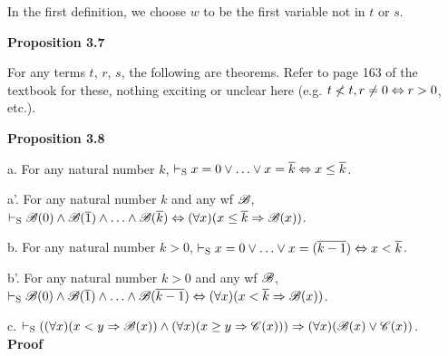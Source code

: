 In the first definition, we choose $w$ to be the first variable not in $t$ or $s$.

\textbf{Proposition 3.7}

For any terms $t$, $r$, $s$, the following are theorems. Refer to page 163 of the textbook for these, nothing exciting or unclear here (e.g. $t \not < t, r \not = 0 \Leftrightarrow r > 0$, etc.).

\textbf{Proposition 3.8}

a. For any natural number $k$, $\vdash_\text{S} x=0 \lor \ldots \lor x= \overline{k} \Leftrightarrow x \leq \overline{k}$.

a'. For any natural number $k$ and any wf $\mathscr{B}$, $\vdash_\text{S} \mathscr{B}(0) \land \mathscr{B}(\overline{1}) \land \ldots \land \mathscr{B}(\overline{k}) \Leftrightarrow (\forall x)(x\leq \overline{k} \Rightarrow \mathscr{B}(x))$. 

b. For any natural number $k>0$, $\vdash_\text{S} x=0 \lor \ldots \lor x = (\overline{k-1}) \Leftrightarrow x < \overline{k}$.

b'. For any natural number $k>0$ and any wf $\mathscr{B}$, $\vdash_\text{S} \mathscr{B}(0) \land \mathscr{B}(\overline{1}) \land \ldots \land \mathscr{B}(\overline{k-1}) \Leftrightarrow (\forall x)(x < \overline{k} \Rightarrow \mathscr{B}(x))$. 

c. $\vdash_\text{S} ((\forall x)(x<y \Rightarrow \mathscr{B}(x)) \land (\forall x)(x \geq y \Rightarrow \mathscr{C}(x))) \Rightarrow (\forall x)(\mathscr{B}(x) \lor \mathscr{C}(x))$.\\

\textbf{Proof}

